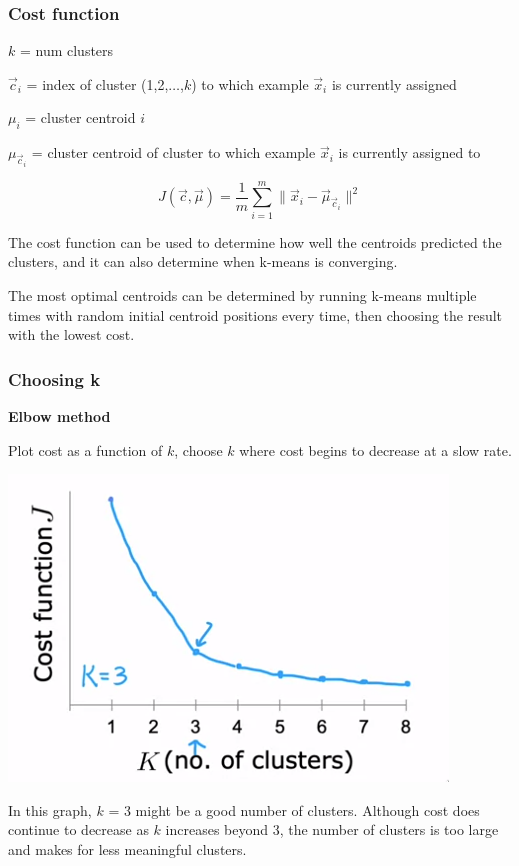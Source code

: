 \documentclass[12pt]{article}
\begin{document}
\subsubsection{Cost function}

$k$ = num clusters

$\vec{c}_i$ = index of cluster (1,2,$\ldots$,$k$) to which example $\vec{x}_i$ is currently assigned

$\mu_i$ = cluster centroid $i$

$\mu_{\vec{c}_i}$ = cluster centroid of cluster to which example $\vec{x}_i$ is currently assigned to

\[ J(\vec{c},\vec{\mu}) = \frac{1}{m} \sum_{i=1}^m \| \vec{x}_i - \vec{\mu}_{\vec{c}_i} \|^2 \]

The cost function can be used to determine how well the centroids predicted the clusters, and it can
also determine when k-means is converging.

The most optimal centroids can be determined by running k-means multiple times with random initial centroid
positions every time, then choosing the result with the lowest cost.

\subsubsection{Choosing k}

\textbf{Elbow method}

Plot cost as a function of $k$, choose $k$ where cost begins to decrease at a slow rate.

\includegraphics[scale=.6]{elbow}

In this graph, $k$ = 3 might be a good number of clusters. Although cost does continue to decrease as $k$ increases
beyond 3, the number of clusters is too large and makes for less meaningful clusters.
\end{document}
